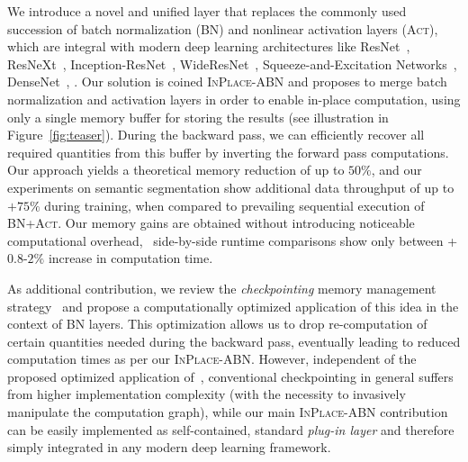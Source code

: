 \documentclass[10pt,twocolumn,letterpaper]{article}
\newcommand{\bnInplace}{\textsc{InPlace-ABN}\xspace}
\begin{document}
We introduce a novel and unified layer that replaces the commonly used succession of batch normalization (\textsc{BN}) and nonlinear activation layers (\textsc{Act}), which are integral with modern deep learning architectures like ResNet~\cite{He2015b}, ResNeXt~\cite{Xie2016}, Inception-ResNet~\cite{Szegedy2016}, WideResNet~\cite{Zagoruyko2016WRN}, Squeeze-and-Excitation Networks~\cite{Hu2017}, DenseNet~\cite{Huang2017}, \etc. Our solution is coined \bnInplace and proposes to merge batch normalization and activation layers in order to enable in-place computation, using only a single memory buffer for storing the results (see illustration in Figure~\ref{fig:teaser}). During the backward pass, we can efficiently recover all required quantities from this buffer by inverting the forward pass computations.
Our approach yields a theoretical memory reduction of up to $50\%$, and our experiments on semantic segmentation show additional data throughput of up to $+75\%$ during training, when compared to prevailing sequential execution of \textsc{BN+Act}. Our memory gains are obtained without introducing noticeable computational overhead, \ie~side-by-side runtime comparisons show only between +$0.8$-$2\%$ increase in computation time. %

As additional contribution, we review the \textit{checkpointing} memory management strategy~\cite{Chen+16} and propose a computationally optimized application of this idea in the context of \textsc{BN} layers. This optimization allows us to drop re-computation of certain quantities needed during the backward pass, eventually leading to reduced computation times as per our \bnInplace. However, independent of the proposed optimized application of~\cite{Chen+16}, conventional checkpointing in general suffers from higher implementation complexity (with the necessity to invasively manipulate the computation graph), while our main \bnInplace contribution can be easily implemented as self-contained, standard \textit{plug-in layer} and therefore simply integrated in any modern deep learning framework.
\end{document}
